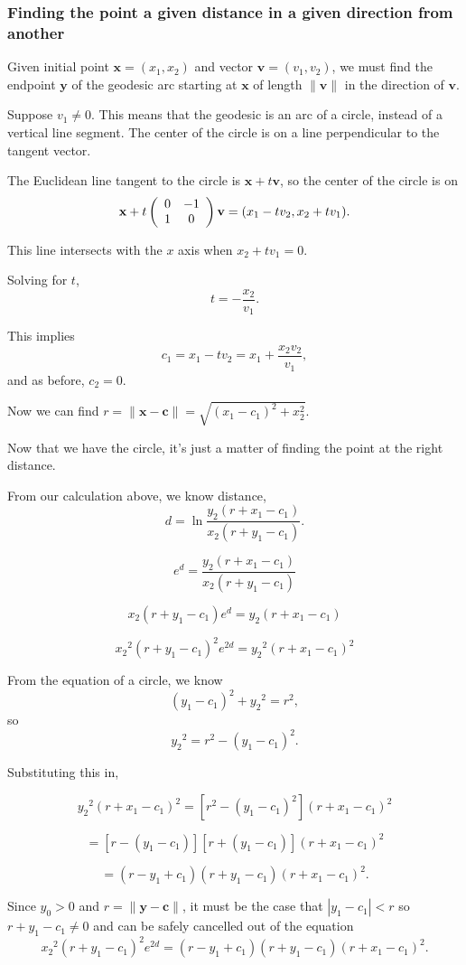 \subsubsection{Finding the point a given distance in a given direction from another}

Given initial point $\textbf{x} = (x_1,x_2)$ and vector $\textbf{v} = (v_1,v_2)$, we must find the endpoint $\textbf{y}$ of the geodesic arc starting at $\textbf{x}$ of length $\|\textbf{v}\|$ in the direction of $\textbf{v}$.

Suppose $v_1 \neq 0$. This means that the geodesic is an arc of a circle, instead of a vertical line segment. The center of the circle is on a line perpendicular to the tangent vector.

The Euclidean line tangent to the circle is $\textbf{x}+t\textbf{v}$, so the center of the circle is on $$\textbf{x}+t\left(\begin{array}{ccc} 0 & -1 \\1 & 0 \end{array} \right)\textbf{v} = (x_1-tv_2,x_2+tv_1).$$

This line intersects with the $x$ axis when $x_2+tv_1 = 0$.

Solving for $t$, $$t = -\frac{x_2}{v_1}.$$

This implies $$c_1 = x_1-tv_2 = x_1+\frac{x_2v_2}{v_1},$$ and as before, $c_2 = 0$.

Now we can find $r = \|\textbf{x}-\textbf{c}\| = \sqrt{(x_1 - c_1)^2 + x_2^2}$.


Now that we have the circle, it's just a matter of finding the point at the right distance.

From our calculation above, we know distance, $$d = \ln\frac{y_2(r+x_1-c_1)}{x_2(r+y_1-c_1)}.$$

$$e^d = \frac{y_2(r+x_1-c_1)}{x_2(r+y_1-c_1)}$$

$$x_2(r+y_1-c_1)e^d = y_2(r+x_1-c_1)$$

$${x_2}^2(r+y_1-c_1)^2e^{2d} = {y_2}^2(r+x_1-c_1)^2$$

From the equation of a circle, we know $$(y_1-c_1)^2 + {y_2}^2 = r^2,$$ so $${y_2}^2 = r^2 - (y_1-c_1)^2.$$

Substituting this in,

$${y_2}^2(r+x_1-c_1)^2 = [r^2-(y_1-c_1)^2](r+x_1-c_1)^2$$

$$= [r-(y_1-c_1)][r+(y_1-c_1)](r+x_1-c_1)^2$$

$$= (r-y_1+c_1)(r+y_1-c_1)(r+x_1-c_1)^2.$$

Since $y_0 > 0$ and $r = \|\textbf{y}-\textbf{c}\|$, it must be the case that $|y_1-c_1| < r$ so $r+y_1-c_1 \neq 0$ and can be safely cancelled out of the equation $${x_2}^2(r+y_1-c_1)^2e^{2d} = (r-y_1+c_1)(r+y_1-c_1)(r+x_1-c_1)^2.$$

